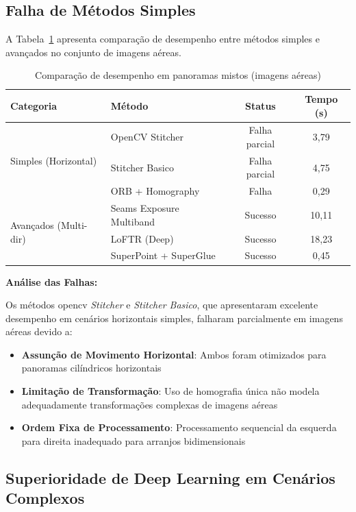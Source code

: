 \subsection{Falha de Métodos Simples}

A Tabela~\ref{tab:mixto-comparison} apresenta comparação de desempenho entre métodos simples e avançados no conjunto de imagens aéreas.

\begin{table}[htb]
\centering
\caption{Comparação de desempenho em panoramas mistos (imagens aéreas)}
\label{tab:mixto-comparison}
\small
\begin{tabular}{llcc}
\hline
\textbf{Categoria} & \textbf{Método} & \textbf{Status} & \textbf{Tempo (s)} \\ \hline
\multirow{3}{*}{Simples (Horizontal)} & OpenCV Stitcher & Falha parcial & 3,79 \\
& Stitcher Basico & Falha parcial & 4,75 \\
& ORB + Homography & Falha & 0,29 \\
\hline
\multirow{3}{*}{Avançados (Multi-dir)} & Seams Exposure Multiband & Sucesso & 10,11 \\
& LoFTR (Deep) & Sucesso & 18,23 \\
& SuperPoint + SuperGlue & Sucesso & 0,45 \\
\hline
\end{tabular}
\end{table}

\textbf{Análise das Falhas:}

Os métodos \gls{opencv} \textit{Stitcher} e \textit{Stitcher Basico}, que apresentaram excelente desempenho em cenários horizontais simples, falharam parcialmente em imagens aéreas devido a:

\begin{itemize}
    \item \textbf{Assunção de Movimento Horizontal}: Ambos foram otimizados para panoramas cilíndricos horizontais
    \item \textbf{Limitação de Transformação}: Uso de homografia única não modela adequadamente transformações complexas de imagens aéreas
    \item \textbf{Ordem Fixa de Processamento}: Processamento sequencial da esquerda para direita inadequado para arranjos bidimensionais
\end{itemize}

\subsection{Superioridade de Deep Learning em Cenários Complexos}

